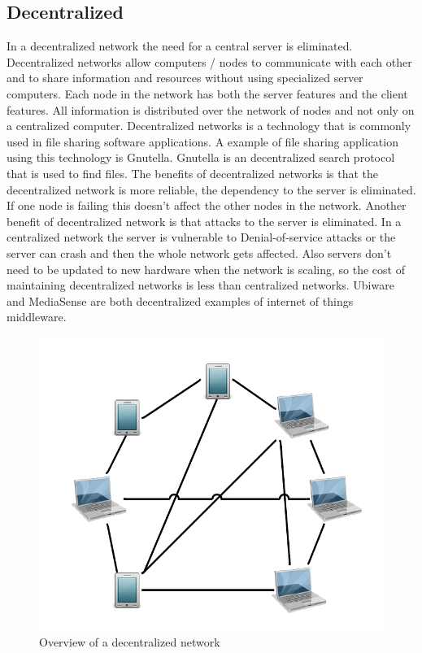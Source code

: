 \subsection{Decentralized}
In a decentralized network the need for a central server is eliminated. Decentralized networks allow computers / nodes to communicate with each other and to share information and resources without using specialized server computers. Each node in the network has both the server features and the client features. All information is distributed over the network of nodes and not only on a centralized computer. Decentralized networks is a technology that is commonly used in file sharing software applications. A example of file sharing application using this technology is Gnutella. Gnutella is an decentralized search protocol that is used to find files. The benefits of decentralized networks is that the decentralized network is more reliable, the dependency to the server is eliminated. If one node is failing this doesn't affect the other nodes in the network. Another benefit of decentralized network is that attacks to the server is eliminated. In a centralized network the server is vulnerable to Denial-of-service attacks or the server can crash and then the whole network gets affected. Also servers don't need to be updated to new hardware when the network is scaling, so the cost of maintaining decentralized networks is less than centralized networks. Ubiware \cite{osterle2010memorandum} and MediaSense \cite{TheMediaSenseFramework} are both decentralized examples of internet of things middleware. 

\begin{figure}[H]
	\centering
    	\includegraphics[scale=0.25]{part_2/sharing_the_information/Decentralized.png}
		\caption{Overview of a decentralized network} 
\end{figure}